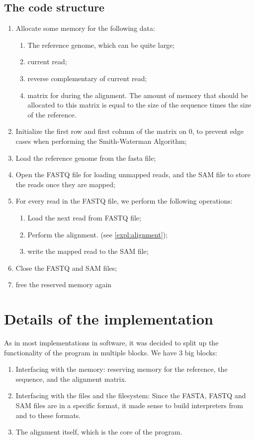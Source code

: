 \subsection{The code structure}

\begin{enumerate}
	\item Allocate some memory for the following data:
	\begin{enumerate}
		\item The reference genome, which can be quite large;
		\item current read;
		\item reverse complementary of current read;
		\item matrix for during the alignment. The amount of memory that should be allocated to this matrix is equal to the size of the sequence times the size of the reference.
	\end{enumerate}
	\item Initialize the first row and first column of the matrix on $0$, to prevent edge cases when performing the Smith-Waterman Algorithm;
	\item Load the reference genome from the fasta file;
	\item Open the FASTQ file for loading unmapped reads, and the SAM file to store the reads once they are mapped;
	\item For every read in the FASTQ file, we perform the following operations:
	\begin{enumerate}
		\item Load the next read from FASTQ file;
		\item Perform the alignment. (see \ref{expl:alignment});
		\item write the mapped read to the SAM file;
	\end{enumerate}
	\item Close the FASTQ and SAM files;
	\item free the reserved memory again
\end{enumerate}

\section{Details of the implementation}

As in most implementations in software, it was decided to split up the functionality of the program in multiple blocks. We have 3 big blocks:
\begin{enumerate}
	\item Interfacing with the memory: reserving memory for the reference, the sequence, and the alignment matrix.
	\item Interfacing with the files and the filesystem: Since the FASTA, FASTQ and SAM files are in a specific format, it made sense to build interpreters from and to these formats. 
	\item The alignment itself, which is the core of the program.
\end{enumerate}

